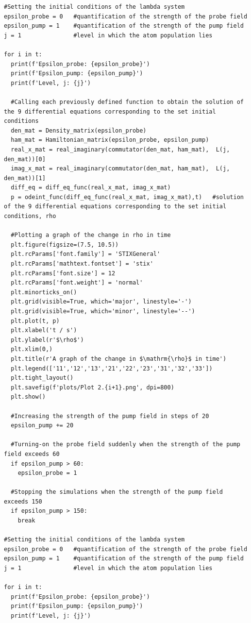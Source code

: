 \documentclass[12pt, a4paper]{article}
\begin{document}
\begin{lstlisting}[language=iPython]
#Setting the initial conditions of the lambda system
epsilon_probe = 0   #quantification of the strength of the probe field
epsilon_pump = 1    #quantification of the strength of the pump field
j = 1               #level in which the atom population lies

for i in t:
  print(f'Epsilon_probe: {epsilon_probe}')
  print(f'Epsilon_pump: {epsilon_pump}')
  print(f'Level, j: {j}')

  #Calling each previously defined function to obtain the solution of the 9 differential equations corresponding to the set initial conditions
  den_mat = Density_matrix(epsilon_probe)
  ham_mat = Hamiltonian_matrix(epsilon_probe, epsilon_pump)
  real_x_mat = real_imaginary(commutator(den_mat, ham_mat),  L(j, den_mat))[0]
  imag_x_mat = real_imaginary(commutator(den_mat, ham_mat),  L(j, den_mat))[1]
  diff_eq = diff_eq_func(real_x_mat, imag_x_mat)
  p = odeint_func(diff_eq_func(real_x_mat, imag_x_mat),t)   #solution of the 9 differential equations corresponding to the set initial conditions, rho

  #Plotting a graph of the change in rho in time
  plt.figure(figsize=(7.5, 10.5))
  plt.rcParams['font.family'] = 'STIXGeneral'
  plt.rcParams['mathtext.fontset'] = 'stix'
  plt.rcParams['font.size'] = 12
  plt.rcParams['font.weight'] = 'normal'
  plt.minorticks_on()
  plt.grid(visible=True, which='major', linestyle='-')
  plt.grid(visible=True, which='minor', linestyle='--')
  plt.plot(t, p)
  plt.xlabel('t / s')
  plt.ylabel(r'$\rho$')
  plt.xlim(0,)
  plt.title(r'A graph of the change in $\mathrm{\rho}$ in time')
  plt.legend(['11','12','13','21','22','23','31','32','33'])
  plt.tight_layout()
  plt.savefig(f'plots/Plot 2.{i+1}.png', dpi=800)
  plt.show()

  #Increasing the strength of the pump field in steps of 20
  epsilon_pump += 20

  #Turning-on the probe field suddenly when the strength of the pump field exceeds 60
  if epsilon_pump > 60:
    epsilon_probe = 1

  #Stopping the simulations when the strength of the pump field exceeds 150
  if epsilon_pump > 150:
    break

#Setting the initial conditions of the lambda system
epsilon_probe = 0   #quantification of the strength of the probe field
epsilon_pump = 1    #quantification of the strength of the pump field
j = 1               #level in which the atom population lies

for i in t:
  print(f'Epsilon_probe: {epsilon_probe}')
  print(f'Epsilon_pump: {epsilon_pump}')
  print(f'Level, j: {j}')


\end{lstlisting}
\end{document}
